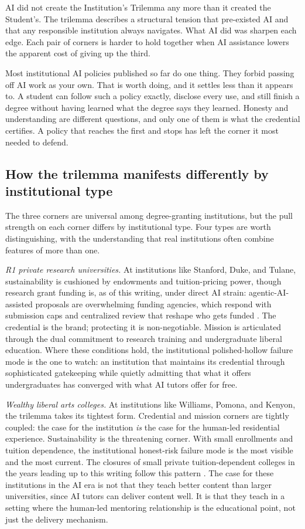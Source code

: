 \documentclass{SIAMbook2023}
\begin{document}
AI did not create the Institution's Trilemma any more than it created the Student's. The trilemma describes a structural tension that pre-existed AI and that any responsible institution always navigates. What AI did was sharpen each edge. Each pair of corners is harder to hold together when AI assistance lowers the apparent cost of giving up the third.

Most institutional AI policies published so far do one thing. They forbid passing off AI work as your own. That is worth doing, and it settles less than it appears to. A student can follow such a policy exactly, disclose every use, and still finish a degree without having learned what the degree says they learned. Honesty and understanding are different questions, and only one of them is what the credential certifies. A policy that reaches the first and stops has left the corner it most needed to defend.

\subsection{How the trilemma manifests differently by institutional type}
\label{u:subsec:trilemma-by-type}

The three corners are universal among degree-granting institutions, but the pull strength on each corner differs by institutional type. Four types are worth distinguishing, with the understanding that real institutions often combine features of more than one.

\textit{R1 private research universities.} At institutions like Stanford, Duke, and Tulane, sustainability is cushioned by endowments and tuition-pricing power, though research grant funding is, as of this writing, under direct AI strain: agentic-AI-assisted proposals are overwhelming funding agencies, which respond with submission caps and centralized review that reshape who gets funded \citep{rees2026agentic}. The credential is the brand; protecting it is non-negotiable. Mission is articulated through the dual commitment to research training and undergraduate liberal education. Where these conditions hold, the institutional polished-hollow failure mode is the one to watch: an institution that maintains its credential through sophisticated gatekeeping while quietly admitting that what it offers undergraduates has converged with what AI tutors offer for free.

\textit{Wealthy liberal arts colleges.} At institutions like Williams, Pomona, and Kenyon, the trilemma takes its tightest form. Credential and mission corners are tightly coupled: the case for the institution \emph{is} the case for the human-led residential experience. Sustainability is the threatening corner. With small enrollments and tuition dependence, the institutional honest-risk failure mode is the most visible and the most current. The closures of small private tuition-dependent colleges in the years leading up to this writing follow this pattern \citep{levine2026upheaval}. The case for these institutions in the AI era is not that they teach better content than larger universities, since AI tutors can deliver content well. It is that they teach in a setting where the human-led mentoring relationship is the educational point, not just the delivery mechanism.
\end{document}
